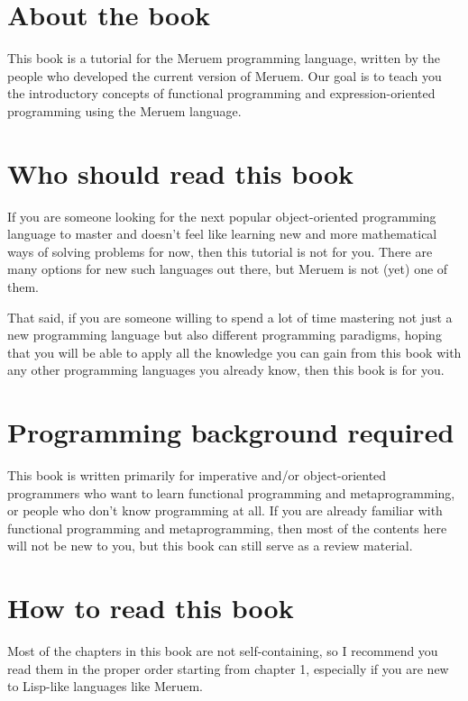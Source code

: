 \section{About the book}
This book is a tutorial for the Meruem programming language, written by the people who developed the current version of Meruem. Our goal is to teach you the introductory concepts of functional programming and expression-oriented programming using the Meruem language. 

\section{Who should read this book}
If you are someone looking for the next popular object-oriented programming language to master and doesn't feel like learning new and more mathematical ways of solving problems for now, then this tutorial is not for you. There are many options for new such languages out there, but Meruem is not (yet) one of them.

That said, if you are someone willing to spend a lot of time mastering not just a new programming language but also different programming paradigms, hoping that you will be able to apply all the knowledge you can gain from this book with any other programming languages you already know, then this book is for you.

\section{Programming background required}
This book is written primarily for imperative and/or object-oriented programmers who want to learn functional programming and metaprogramming, or people who don't know programming at all. If you are already familiar with functional programming and metaprogramming, then most of the contents here will not be new to you, but this book can still serve as a review material.

\section{How to read this book}
Most of the chapters in this book are not self-containing, so I recommend you read them in the proper order starting from chapter 1, especially if you are new to Lisp-like languages like Meruem. 